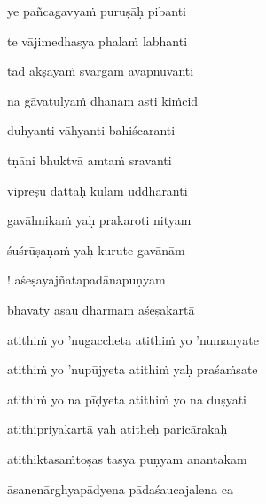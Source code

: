 \nemslokab 
ye pañcagavya\.m puruṣāḥ pibanti \danda\dontdisplaylinenum

\nemslokac 
te vājimedhasya phala\.m labhanti
\dontdisplaylinenum

\nemslokad 
tad akṣaya\.m svargam avāpnuvanti \veg\dontdisplaylinenum

\ujvers\nemsloka 
na gāvatulya\.m dhanam asti ki\.mcid
\dontdisplaylinenum

\nemslokab 
duhyanti vāhyanti bahiścaranti \danda\dontdisplaylinenum

\nemslokac 
tṇāni bhuktvā amta\.m sravanti
\dontdisplaylinenum

\nemslokad 
vipreṣu dattāḥ kulam uddharanti \veg\dontdisplaylinenum

\ujvers\nemsloka 
gavāhnika\.m yaḥ prakaroti nityam
\dontdisplaylinenum

\nemslokab 
śuśrūṣaṇa\.m yaḥ kurute gavānām \danda\dontdisplaylinenum

\nemslokac 
! aśeṣayajñatapadānapuṇyam
\dontdisplaylinenum

\nemslokad 
bhavaty asau dharmam aśeṣakartā \veg\dontdisplaylinenum

\vers

atithi\.m yo 'nugaccheta atithi\.m yo 'numanyate\thinspace{\dandab} \dontdisplaylinenum

atithi\.m yo 'nupūjyeta atithi\.m yaḥ praśa\.msate \veg\dontdisplaylinenum

atithi\.m yo na pīḍyeta atithi\.m yo na duṣyati\thinspace{\dandab} \dontdisplaylinenum

atithipriyakartā yaḥ atitheḥ paricārakaḥ \veg\dontdisplaylinenum

atithiktasa\.mtoṣas tasya puṇyam anantakam\thinspace{\dandab} \dontdisplaylinenum

āsanenārghyapādyena pādaśaucajalena ca \veg\dontdisplaylinenum

